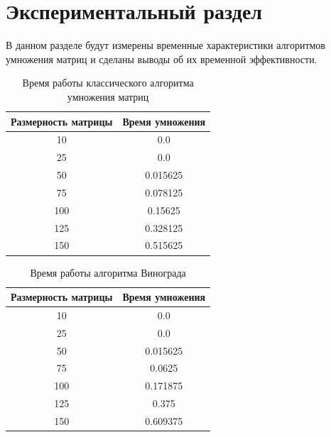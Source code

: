 \chapter{Экспериментальный раздел}

В данном разделе будут измерены временные характеристики алгоритмов умножения матриц и сделаны выводы об их временной эффективности.

\begin{table}[h!]
  \begin{center}
    \captionsetup{justification=raggedright}
    \caption{Время работы классического алгоритма умножения матриц}
    \label{tab:workcost_classic}
    \begin{tabular}{c|c}
      \textbf{Размерность матрицы} & \textbf{Время умножения}\\
      \hline
	10 & 0.0\\
	25 & 0.0\\
	50 & 0.015625\\
	75 & 0.078125\\
	100 & 0.15625\\
	125 & 0.328125\\
	150 & 0.515625\\
    \end{tabular}
  \end{center}
\end{table}

\begin{table}[h!]
  \begin{center}
    \captionsetup{justification=raggedright}
    \caption{Время работы алгоритма Винограда}
    \label{tab:workcost_classic}
    \begin{tabular}{c|c}
      \textbf{Размерность матрицы} & \textbf{Время умножения}\\
      \hline
	10 & 0.0\\
	25 & 0.0\\
	50 & 0.015625\\
	75 & 0.0625\\
	100 & 0.171875\\
	125 & 0.375\\
	150 & 0.609375\\
    \end{tabular}
  \end{center}
\end{table}

